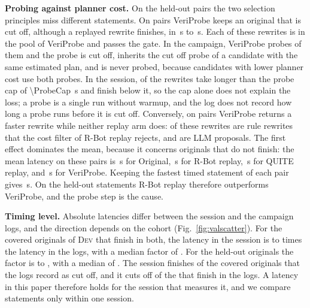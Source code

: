 \documentclass[conference]{IEEEtran}
\newcommand{\sys}{VeriProbe}
\newcommand{\secs}[1]{#1\,s}
\begin{document}
\textbf{Probing against planner cost.}
On the \ValHeldAllDone{} held-out pairs the two selection principles miss different statements.
On \ValHeldAllMissedOrigCutOff{} pairs \sys{} keeps an original that is cut off, although a replayed rewrite finishes, in \secs{\ValHeldAllMissedMin} to \secs{\ValHeldAllMissedMax}.
Each of these rewrites is in the pool of \sys{} and passes the gate.
In the campaign, \sys{} probes \ValHeldAllRescueProbed{} of them and the probe is cut off, \ValHeldAllRescueInherited{} inherits the cut off probe of a candidate with the same estimated plan, and \ValHeldAllRescueNotProbed{} is never probed, because candidates with lower planner cost use both probes.
In the session, \ValHeldAllMissedOverCap{} of the rewrites take longer than the probe cap of \SI{\ProbeCap}{\second} and \ValHeldAllMissedUnderCap{} finish below it, so the cap alone does not explain the loss; a probe is a single run without warmup, and the log does not record how long a probe runs before it is cut off.
Conversely, on \ValHeldAllOursOnly{} pairs \sys{} returns a faster rewrite while neither replay arm does: \ValHeldAllOursOnlyRule{} of these rewrites are rule rewrites that the cost filter of R-Bot replay rejects, and \ValHeldAllOursOnlyMacro{} are LLM proposals.
The first effect dominates the mean, because it concerns originals that do not finish: the mean latency on these pairs is \secs{\ValHeldAllOrigMean} for Original, \secs{\ValHeldAllRbotMean} for R-Bot replay, \secs{\ValHeldAllQuiteMean} for QUITE replay, and \secs{\ValHeldAllOursMean} for \sys{}.
Keeping the fastest timed statement of each pair gives \secs{\ValHeldAllBestMean}.
On the held-out statements R-Bot replay therefore outperforms \sys{}, and the probe step is the cause.

\textbf{Timing level.}
Absolute latencies differ between the session and the campaign logs, and the direction depends on the cohort (Fig.~\ref{fig:valscatter}).
For the \ValDevDriftN{} covered originals of \textsc{Dev} that finish in both, the latency in the session is \ValDevDriftMin{} to \ValDevDriftMax{} times the latency in the logs, with a median factor of \ValDevDriftMedian{}.
For the \ValHeldAllDriftN{} held-out originals the factor is \ValHeldAllDriftMin{} to \ValHeldAllDriftMax{}, with a median of \ValHeldAllDriftMedian{}.
The session finishes \ValOrigNowFinished{} of the \ValOrigCampaignCutOff{} covered originals that the logs record as cut off, and it cuts off \ValOrigNowCutOff{} of the \ValOrigCampaignFinished{} that finish in the logs.
A latency in this paper therefore holds for the session that measures it, and we compare statements only within one session.
\end{document}
